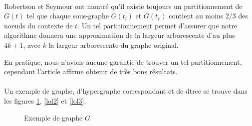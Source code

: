 \documentclass{article}
\begin{document}
\paragraph{}
Robertson et Seymour \cite{robert} ont montré qu'il existe toujours
un partitionnement de $G(t)$ tel que chaque sous-graphe $G(t_l)$ et
$G(t_r)$ contient au moins $2/3$ des noeuds du contexte de $t$.  Un
tel partitionnement permet d'assurer que notre algorithme donnera une
approximation de la largeur arborescente d'au plus $4k+1$, avec $k$ la
largeur arborescente du graphe original. 

En pratique, nous n'avons aucune garantie de trouver un tel partitionnement,
cependant l'article affirme obtenir de très bons résultats.

\paragraph{}
Un exemple de graphe, d'hypergraphe correspondant et de dtree se
trouve dans les figures \ref{lol1}, \ref{lol2} et \ref{lol3}.
\newpage

\begin{figure}[H]
 \centering
{}
\caption{Exemple de graphe $G$}
\label{lol1}
\end{figure}
\end{document}
